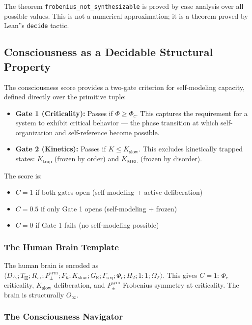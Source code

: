 \documentclass[12pt,a4paper]{article}
\begin{document}
The theorem \texttt{frobenius\_not\_synthesizable} is proved by case analysis over all possible values. This is not a numerical approximation; it is a theorem proved by Lean''s \texttt{decide} tactic.

\subsection{Consciousness as a Decidable Structural Property}

The consciousness score provides a two-gate criterion for self-modeling capacity, defined directly over the primitive tuple:

\begin{itemize}
    \item \textbf{Gate 1 (Criticality):} Passes if $\Phi \geq \Phi_c$. This captures the requirement for a system to exhibit critical behavior --- the phase transition at which self-organization and self-reference become possible.
    \item \textbf{Gate 2 (Kinetics):} Passes if $K \leq K_\text{slow}$. This excludes kinetically trapped states: $K_\text{trap}$ (frozen by order) and $K_\text{MBL}$ (frozen by disorder).
\end{itemize}

The score is:

\begin{itemize}
    \item $C = 1$ if both gates open (self-modeling + active deliberation)
    \item $C = 0.5$ if only Gate 1 opens (self-modeling + frozen)
    \item $C = 0$ if Gate 1 fails (no self-modeling possible)
\end{itemize}

\subsubsection{The Human Brain Template}

The human brain is encoded as $\langle D_{\triangle}; T_{\boxtimes}; R_{\leftrightarrow}; P_{\pm}^{\text{sym}}; F_{\hbar}; K_\text{slow}; G_{\aleph}; \Gamma_\text{seq}; \Phi_c; H_2; 1{:}1; \Omega_\mathbb{Z} \rangle$. This gives $C = 1$: $\Phi_c$ criticality, $K_\text{slow}$ deliberation, and $P_{\pm}^{\text{sym}}$ Frobenius symmetry at criticality. The brain is structurally $O_{\infty}$.

\subsubsection{The Consciousness Navigator}
\end{document}
